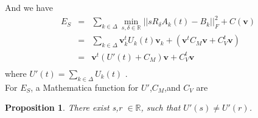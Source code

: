 \documentclass[8pt]{article}
\newtheorem{prop}{\bf Proposition}
\begin{document}
And we have
\begin{eqnarray*}
E_S &=& \sum_{k \in \Delta}\min_{s, \delta \in \mathbb{R}}||sR_{\delta}A_k(t) - B_k||_F^2 + C(\mathbf{v})\\
	&=& \sum_{k \in \Delta}\mathbf{v}_k^t U_k(t) \mathbf{v}_k + (\mathbf{v}^t C_M \mathbf{v} + C_V^t \mathbf{v}) \\
	&=& \mathbf{v}^t (U'(t) + C_M)\mathbf{v} + C_V^t \mathbf{v}\\
\end{eqnarray*}
where $ \displaystyle U' (t)=  \sum_{k \in \Delta}U_k(t)$ .\\
For $E_S$, a Mathematica function for $U'$,$C_M$,and $C_V$ are 

\begin{prop}
There exist  s,r $\in \mathbb{R}$, such that $U'(s) \not= U'(r)$.
\end{prop}
\end{document}
